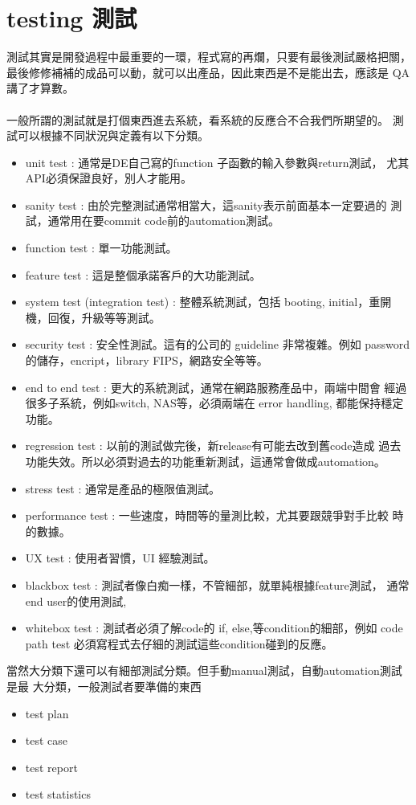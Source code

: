 \chapter{testing 測試}
測試其實是開發過程中最重要的一環，程式寫的再爛，只要有最後測試嚴格把關，
最後修修補補的成品可以動，就可以出產品，因此東西是不是能出去，應該是
QA 講了才算數。
\\\\
一般所謂的測試就是打個東西進去系統，看系統的反應合不合我們所期望的。
測試可以根據不同狀況與定義有以下分類。
\begin{itemize}
  \item unit test : 通常是DE自己寫的function 子函數的輸入參數與return測試，
    尤其API必須保證良好，別人才能用。
  \item sanity test : 由於完整測試通常相當大，這sanity表示前面基本一定要過的
    測試，通常用在要commit code前的automation測試。
  \item function test : 單一功能測試。
  \item feature test : 這是整個承諾客戶的大功能測試。
  \item system test (integration test) : 整體系統測試，包括 booting, 
    initial，重開機，回復，升級等等測試。
  \item security test : 安全性測試。這有的公司的 guideline 非常複雜。例如
    password的儲存，encript，library FIPS，網路安全等等。
  \item end to end test : 更大的系統測試，通常在網路服務產品中，兩端中間會
    經過很多子系統，例如switch, NAS等，必須兩端在 error handling, 
    都能保持穩定功能。
  \item regression test : 以前的測試做完後，新release有可能去改到舊code造成
    過去功能失效。所以必須對過去的功能重新測試，這通常會做成automation。
  \item stress test : 通常是產品的極限值測試。
  \item performance test : 一些速度，時間等的量測比較，尤其要跟競爭對手比較
    時的數據。
  \item UX test : 使用者習慣，UI 經驗測試。
  \item blackbox test : 測試者像白痴一樣，不管細部，就單純根據feature測試，
    通常end user的使用測試, 
  \item whitebox test : 測試者必須了解code的 if, else,等condition的細部，例如
    code path test 必須寫程式去仔細的測試這些condition碰到的反應。
\end{itemize}
當然大分類下還可以有細部測試分類。但手動manual測試，自動automation測試是最
大分類，一般測試者要準備的東西
\begin{itemize}
  \item test plan
  \item test case
  \item test report
  \item test statistics
\end{itemize}

